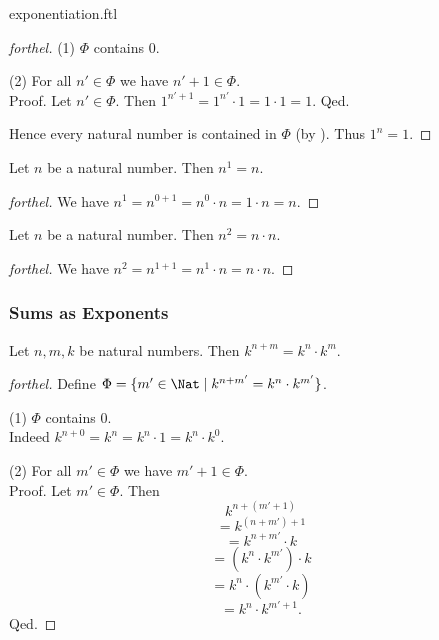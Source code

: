 \documentclass{naproche-library}
\begin{document}
\begin{smodule}{exponentiation.ftl}
\begin{proof}[forthel]
    (1) $\Phi$ contains $0$.

    (2) For all $n' \in \Phi$ we have $n' + 1 \in \Phi$. \\
    Proof.
      Let $n' \in \Phi$.
      Then $1^{n' + 1}
        = 1^{n'} \cdot 1
        = 1 \cdot 1
        = 1$.
    Qed.

    Hence every natural number is contained in $\Phi$ (by ).
    Thus $1^{n} = 1$.
  \end{proof}

  \begin{proposition}[forthel,id=ARITHMETIC_09_4975279749464064,printid]
    Let $n$ be a natural number.
    Then $n^{1} = n$.
  \end{proposition}
  \begin{proof}[forthel]
    We have $n^{1}
      = n^{0 + 1}
      = n^{0} \cdot n
      = 1 \cdot n
      = n$.
  \end{proof}

  \begin{proposition}[forthel,id=ARITHMETIC_09_8513812055457792,printid]
    Let $n$ be a natural number.
    Then $n^{2} = n \cdot n$.
  \end{proposition}
  \begin{proof}[forthel]
    We have $n^{2}
      = n^{1 + 1}
      = n^{1} \cdot n
      = n \cdot n$.
  \end{proof}


  \subsubsection*{Sums as Exponents}

  \begin{proposition}[forthel,id=ARITHMETIC_09_8152207530655744,printid]
    Let $n, m, k$ be natural numbers.
    Then $k^{n + m} = k^{n} \cdot k^{m}$.
  \end{proposition}
  \begin{proof}[forthel]
    Define $\Phi = \{ m' \in \Nat \mid k^{n + m'} = k^{n} \cdot k^{m'} \}$.

    (1) $\Phi$ contains $0$. \\
    Indeed $k^{n + 0}
      = k^{n}
      = k^{n} \cdot 1
      = k^{n} \cdot k^{0}$.

    (2) For all $m' \in \Phi$ we have $m' + 1 \in \Phi$. \\
    Proof.
      Let $m' \in \Phi$.
      Then
      \[  k^{n + (m' + 1)}                  \]
      \[    = k^{(n + m') + 1}              \]
      \[    = k^{n + m'} \cdot k            \]
      \[    = (k^{n} \cdot k^{m'}) \cdot k  \]
      \[    = k^{n} \cdot (k^{m'} \cdot k)  \]
      \[    = k^{n} \cdot k^{m' + 1}.       \]
    Qed.


\end{proof}
\end{smodule}
\end{document}
